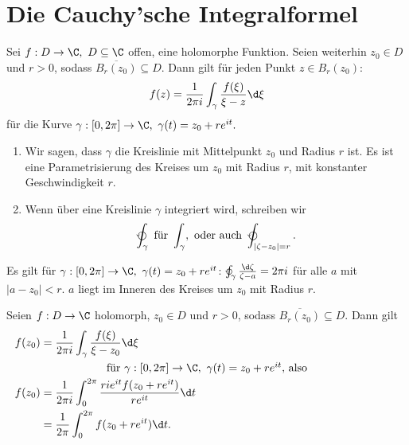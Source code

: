 \section{Die Cauchy'sche Integralformel}\lecture
		
		\begin{thm}
			Sei $ f: D \to \C,\ D \subseteq \C $ offen, eine holomorphe Funktion. Seien weiterhin $ z_0 \in D $ und $ r > 0 $, sodass $ \overbar{B_r(z_0)} \subseteq D. $ Dann gilt für jeden Punkt $ z \in B_r(z_0) $:
			\[ f(z) = \frac{1}{2\pi i} \int_\gamma \frac{f(\xi)}{\xi - z} \d \xi \]
			für die Kurve $ \gamma: [0,2\pi] \to \C,\ \gamma(t) = z_0 + re^{it}. $
		\end{thm}
		
		\begin{rem*}
			\begin{enumerate}[label = {\alph*})]
				\item Wir sagen, dass $\gamma$ die Kreislinie mit Mittelpunkt $z_0$ und Radius $r$ ist. Es ist eine Parametrisierung des Kreises um $z_0$ mit Radius $r$, mit konstanter Geschwindigkeit $r$.
				\item Wenn über eine Kreislinie $\gamma$ integriert wird, schreiben wir 
				$$ \varointctrclockwise_\gamma\ \text{für } \int_\gamma,\ \text{oder auch } \varointctrclockwise_{|\zeta - z_0|=r}. $$
			\end{enumerate}
		\end{rem*}
		
		\begin{lem}
			Es gilt für $ \gamma: [0,2\pi] \to \C,\ \gamma(t) = z_0 + re^{it} $: $ \varointctrclockwise_\gamma \frac{\d \zeta}{\zeta - a} = 2\pi i $ für alle $a$ mit $ |a-z_0| < r. $ $a$ liegt im Inneren des Kreises um $z_0$ mit Radius $r$.
		\end{lem}
		
		\begin{corn}["Mittelwertgleichung"]
			Seien $ f: D \to \C $ holomorph, $ z_0 \in D $ und $ r > 0 $, sodass $ \overbar{B_r(z_0)} \subseteq D $. Dann gilt
			\begin{align*}
				f(z_0) &= \frac{1}{2\pi i} \int_\gamma \frac{f(\xi)}{\xi - z_0} \d \xi\\
				\noalign{\centering für $ \gamma: [0,2\pi] \to \C,\ \gamma(t) = z_0 + re^{it} $, also}
				f(z_0) &= \frac{1}{2\pi i} \int_0^{2\pi} \frac{rie^{it} f(z_0+re^{it})}{re^{it}} \d t\\
				&= \frac{1}{2\pi} \int_0^{2\pi} f(z_0+re^{it}) \d t.
			\end{align*}
		\end{corn}
		
